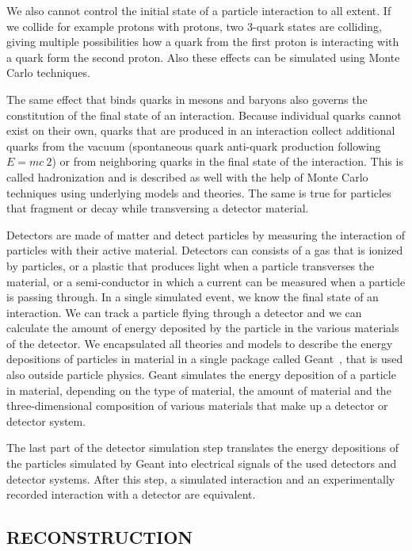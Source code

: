 \documentclass{wscpaperproc}
\theoremstyle{wsc}
\begin{document}
We also cannot control the initial state of a particle interaction to all extent. If we collide for example protons with protons, two 3-quark states are colliding, giving multiple possibilities how a quark from the first proton is interacting with a quark form the second proton. Also these effects can be simulated using Monte Carlo techniques.

The same effect that binds quarks in mesons and baryons also governs the constitution of the final state of an interaction. Because individual quarks cannot exist on their own, quarks that are produced in an interaction collect additional quarks from the vacuum (spontaneous quark anti-quark production following $E=mc~2$) or from neighboring quarks in the final state of the interaction. This is called hadronization and is described as well with the help of Monte Carlo techniques using underlying models and theories. The same is true for particles that fragment or decay while transversing a detector material.

Detectors are made of matter and detect particles by measuring the interaction of particles with their active material. Detectors can consists of a gas that is ionized by particles, or a plastic that produces light when a particle transverses the material, or a semi-conductor in which a current can be measured when a particle is passing through. In a single simulated event, we know the final state of an interaction. We can track a particle flying through a detector and we can calculate the amount of energy deposited by the particle in the various materials of the detector. We encapsulated all theories and models to describe the energy depositions of particles in material in a single package called Geant~, that is used also outside particle physics. Geant simulates the energy deposition of a particle in material, depending on the type of material, the amount of material and the three-dimensional composition of various materials that make up a detector or detector system. 

The last part of the detector simulation step translates the energy depositions of the particles simulated by Geant into electrical signals of the used detectors and detector systems. After this step, a simulated interaction and an experimentally recorded interaction with a detector are equivalent.

\subsection{RECONSTRUCTION}
\label{subsec:reconstruction}
\end{document}
